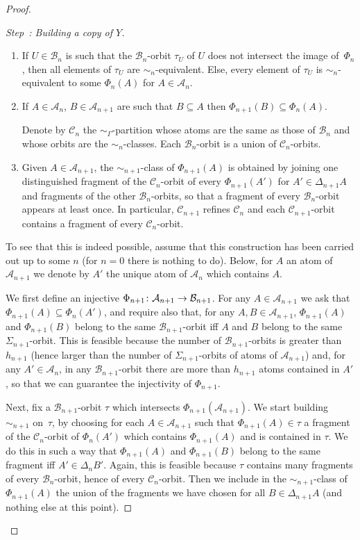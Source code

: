 \documentclass[AHL,Unicode]{cedram}
\newcommand{\mcA}{\mathcal{A}}
\newcommand{\mcB}{\mathcal{B}}
\newcommand{\mcC}{\mathcal{C}}
\newcounter{setofstep}
\newcounter{step}[setofstep]
\newenvironment{step}[1][]{\refstepcounter{step}\begin{proof}[{Step~\thestep\if#1\empty\else: #1\fi}]}{\let\qed\relax\end{proof}}
\renewcommand*{\to}{\mathchoice{\longrightarrow}{\rightarrow}{\rightarrow}{\rightarrow}}
\begin{document}
\begin{proof}
\begin{step}[{Building a copy of $Y$}]
\begin{enumerate}
\item If $U \in \mcB_{n}$ is such that the $\mcB_n$-orbit $\tau_U$ of $U$ does not intersect the image of~$\Phi_n$, then all elements of $\tau_U$ are $\sim_{n}$-equivalent. Else, every element of $\tau_U$ is $\sim_{n}$-equivalent to some $\Phi_{n}(A)$ for $A \in \mcA_{n}$.
\item If $A \in \mcA_n$, $B \in \mcA_{n+1}$ are such that $B \subseteq A$ then $\Phi_{n+1}(B) \subseteq \Phi_n(A)$.

Denote by $\mcC_n$ the $\sim_\Gamma$-partition whose atoms are the same as those of $\mcB_n$ and whose orbits are the $\sim_n$-classes. Each $\mcB_n$-orbit is a union of $\mcC_n$-orbits.

\item Given $A \in \mcA_{n+1}$, the $\sim_{n+1}$-class of $\Phi_{n+1}(A)$ is obtained by joining one distinguished fragment of the $\mcC_{n}$-orbit of every $\Phi_{n+1}(A')$ for $A' \in \Delta_{n+1}A$ and fragments of the other $\mcB_n$-orbits, so that a fragment of every $\mcB_n$-orbit appears at least once. In particular, $\mcC_{n+1}$ refines $\mcC_n$ and each $\mcC_{n+1}$-orbit contains a fragment of every $\mcC_n$-orbit.
\end{enumerate}

To see that this is indeed possible, assume that this construction has been carried out up to some $n$ (for $n=0$ there is nothing to do). Below, for $A$ an atom of $\mcA_{n+1}$ we denote by $A'$ the unique atom of $\mcA_n$ which contains $A$.

We first define an injective $\Phi_{n+1} \colon \mcA_{n+1} \to \mcB_{n+1}$. For any $A \in \mcA_{n+1}$ we ask that $\Phi_{n+1}(A) \subseteq \Phi_n(A')$, and require also that, for any $A,B \in \mcA_{n+1}$, $\Phi_{n+1}(A)$ and $\Phi_{n+1}(B)$ belong to the same $\mcB_{n+1}$-orbit iff $A$ and $B$ belong to the same $\Sigma_{n+1}$-orbit. This is feasible because the number of $\mcB_{n+1}$-orbits is greater than $h_{n+1}$ (hence larger than the number of $\Sigma_{n+1}$-orbits of atoms of $\mcA_{n+1}$) and, for any $A' \in \mcA_n$, in any $\mcB_{n+1}$-orbit there are more than $h_{n+1}$ atoms contained in $A'$, so that we can guarantee the injectivity of $\Phi_{n+1}$.

Next, fix a $\mcB_{n+1}$-orbit $\tau$ which intersects $\Phi_{n+1}(\mcA_{n+1})$. We start building $\sim_{n+1}$ on~$\tau$, by choosing for each $A \in \mcA_{n+1}$ such that $\Phi_{n+1}(A) \in \tau$ a fragment of the $\mcC_n$-orbit of $\Phi_n(A')$ which contains $\Phi_{n+1}(A)$ and is contained in $\tau$. We do this in such a way that $\Phi_{n+1}(A)$ and $\Phi_{n+1}(B)$ belong to the same fragment iff $A' \in \Delta_{n} B'$. Again, this is feasible because $\tau$ contains many fragments of every $\mcB_n$-orbit, hence of every $\mcC_n$-orbit. Then we include in the $\sim_{n+1}$-class of $\Phi_{n+1}(A)$ the union of the fragments we have chosen for all $B \in \Delta_{n+1}A$ (and nothing else at this point).


\end{step}
\end{proof}
\end{document}
